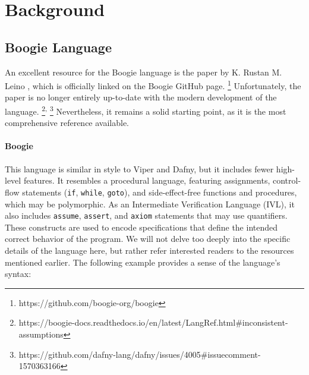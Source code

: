\documentclass[11pt]{article}
\begin{document}
\section{Background}
\label{sec:background}


\subsection{Boogie Language}

An excellent resource for the Boogie language is the paper by K. Rustan M. Leino \cite{leino2008boogie},
which is officially linked on the Boogie GitHub page.
\footnote{https://github.com/boogie-org/boogie}
Unfortunately, the paper is no longer entirely up-to-date with the modern development of the language.
\footnote{https://boogie-docs.readthedocs.io/en/latest/LangRef.html\#inconsistent-assumptions}\textsuperscript{,}
\footnote{https://github.com/dafny-lang/dafny/issues/4005\#issuecomment-1570363166}
Nevertheless, it remains a solid starting point, as it is the most comprehensive reference available.

\paragraph{Boogie} 
This language is similar in style to Viper and Dafny, but it includes fewer high-level features.
It resembles a procedural language, featuring assignments, control-flow statements (\texttt{if}, \texttt{while}, \texttt{goto}),
and side-effect-free functions and procedures, which may be polymorphic.
As an Intermediate Verification Language (IVL), it also includes \texttt{assume}, \texttt{assert},
and \texttt{axiom} statements that may use quantifiers.
These constructs are used to encode specifications that define the intended correct behavior of the program.
We will not delve too deeply into the specific details of the language here,
but rather refer interested readers to the resources mentioned earlier.
The following example provides a sense of the language's syntax:
\end{document}
